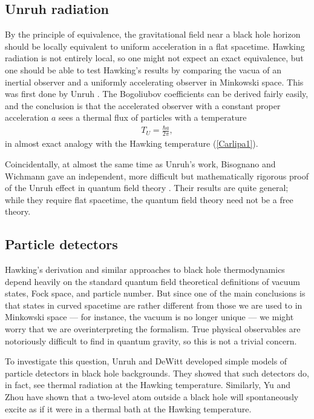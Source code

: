 \documentclass[11pt]{article}
\begin{document}
\subsection{Unruh radiation \label{Unruha}}

By the principle of equivalence, the gravitational field near a black hole
horizon should be locally equivalent to uniform acceleration in a flat
spacetime.  Hawking radiation is not entirely local, so one might not
expect an exact equivalence, but one should be able to test Hawking's
results by comparing the vacua of an inertial observer and a uniformly
accelerating observer in Minkowski space.  This was first done by Unruh
\cite{Unruhc}.  The Bogoliubov coefficients can be derived fairly easily,
and the conclusion is that the accelerated observer with a constant proper 
acceleration $a$ sees a thermal flux of particles with a temperature
\begin{align}
T_U = \frac{\hbar a}{2\pi}  ,
\label{Carlipe1}
\end{align}
in almost exact analogy with the Hawking temperature (\ref{Carlipa1}).

Coincidentally, at almost the same time as Unruh's work, Bisognano 
and Wichmann gave an independent, more difficult but mathematically 
rigorous proof of the Unruh effect in quantum field theory \cite{Bisognano}.
Their results are quite general; while they require flat spacetime,
the quantum field theory need not be a free theory.

\subsection{Particle detectors \label{detecta}}

Hawking's derivation and similar approaches to black hole thermodynamics 
depend heavily on the standard quantum field theoretical definitions of
vacuum states, Fock space, and particle number.  But since one of the 
main conclusions is that states in curved spacetime are rather different 
from those we are used to in Minkowski space --- for instance, the vacuum 
is no longer unique --- we might worry that we are overinterpreting 
the formalism.  True physical observables are notoriously difficult to find
in quantum gravity, so this is not a trivial concern.

To investigate this question, Unruh \cite{Unruhc} and DeWitt \cite{DeWitt}
developed simple models of particle detectors in black hole backgrounds.
They showed that such detectors do, in fact, see thermal radiation at the
Hawking temperature.  Similarly, Yu and Zhou \cite{Yu}  have shown that 
a two-level atom outside a black hole will spontaneously excite as if it
were in a thermal bath at the Hawking temperature.
\end{document}
